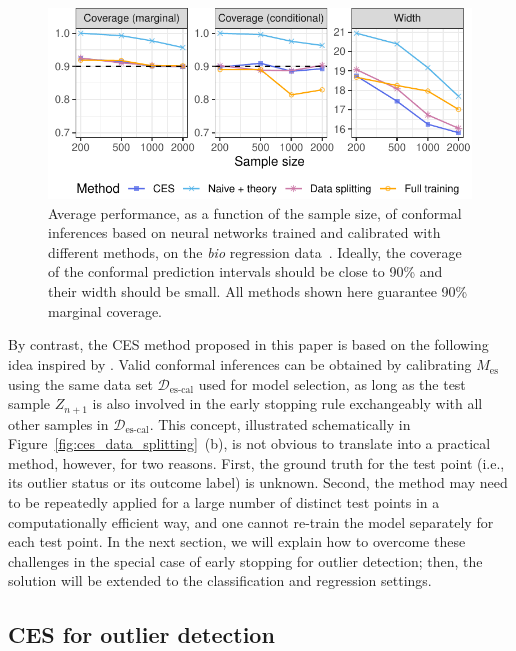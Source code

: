 \begin{figure}[!htb]
    \centering
    \includegraphics[width=\linewidth]{figures/exp_regression_bio_small.pdf}\vspace{-0.5cm}
    \caption{Average performance, as a function of the sample size, of conformal inferences based on neural networks trained and calibrated with different methods, on the {\em bio} regression data~\cite{data-bio}. Ideally, the coverage of the conformal prediction intervals should be close to 90\% and their width should be small. All methods shown here guarantee 90\% marginal coverage. }
    \label{fig:exp_regression_bio}
\end{figure}

By contrast, the CES method proposed in this paper is based on the following idea inspired by \citet{Liang_2022_integrative_p_val}.
Valid conformal inferences can be obtained by calibrating $\hat{M}_{\text{es}}$ using the same data set $\mathcal{D}_{\text{es-cal}}$ used for model selection, as long as the test sample  $Z_{n+1}$ is also involved in the early stopping rule exchangeably with all other samples in $\mathcal{D}_{\text{es-cal}}$.
This concept, illustrated schematically in Figure~\ref{fig:ces_data_splitting}~(b), is not obvious to translate into a practical method, however, for two reasons.
First, the ground truth for the test point (i.e., its outlier status or its outcome label) is unknown. Second, the method may need to be repeatedly applied for a large number of distinct test points in a computationally efficient way, and one cannot re-train the model separately for each test point.
In the next section, we will explain how to overcome these challenges in the special case of early stopping for outlier detection; then, the solution will be extended to the classification and regression settings.

\subsection{CES for outlier detection} \label{sec:outlier}


